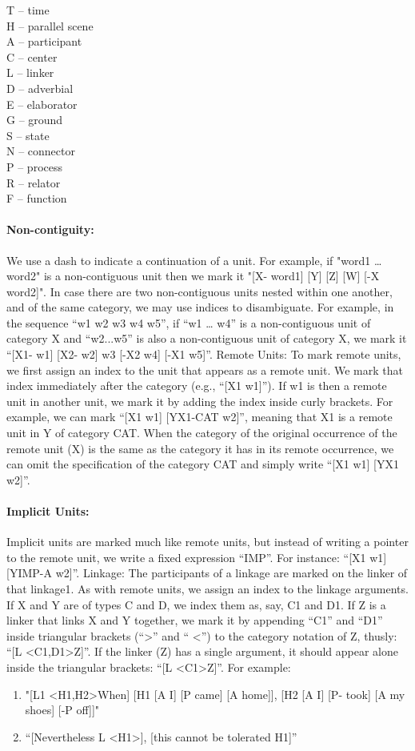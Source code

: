 \documentclass[11pt]{article}
\newcommand{\be}{\begin{enumerate}}
\newcommand{\ee}{\end{enumerate}}
\begin{document}
\noindent
T -- time \\
H -- parallel scene \\
A -- participant \\
C -- center \\
L -- linker\\
D -- adverbial\\
E -- elaborator\\
G -- ground\\
S -- state\\
N -- connector\\
P -- process\\
R -- relator\\
F -- function\\


\paragraph{Non-contiguity:} We use a dash to indicate a continuation of a unit. For example, if "word1 … word2" is a non-contiguous unit then we mark it "[X- word1] [Y] [Z] [W] [-X word2]".
In case there are two non-contiguous units nested within one another, and of the same category, we may use indices to disambiguate. For example, in the sequence ``w1 w2 w3 w4 w5'', if ``w1 … w4'' is a non-contiguous unit of category X and ``w2...w5'' is also a non-contiguous unit of category X, we mark it ``[X1- w1] [X2- w2] w3 [-X2 w4] [-X1 w5]''.
Remote Units: To mark remote units, we first assign an index to the unit that appears as a remote unit. We mark that index immediately after the category (e.g., ``[X1 w1]''). If w1 is then a remote unit in another unit, we mark it by adding the index inside curly brackets. For example, we can mark ``[X1 w1] [Y{X1-CAT} w2]'', meaning that X1 is a remote unit in Y of category CAT. When the category of the original occurrence of the remote unit (X) is the same as the category it has in its remote occurrence, we can omit the specification of the category CAT and simply write ``[X1 w1] [Y{X1} w2]''.

\paragraph{Implicit Units:}
Implicit units are marked much like remote units, but instead of writing a pointer to the remote unit, we write a fixed expression ``IMP''. For instance: ``[X1 w1] [Y{IMP-A} w2]''.
Linkage: The participants of a linkage are marked on the linker of that linkage1. As with remote units, we assign an index to the linkage arguments. If X and Y are of types C and D, we index them as, say, C1 and D1. If Z is a linker that links X and Y together, we mark it by appending ``C1'' and ``D1'' inside triangular brackets (``\textgreater'' and `` \textless '') to the category notation of Z, thusly: ``[L \textless C1,D1\textgreater Z]''. If the linker (Z) has a single argument, it should appear alone inside the triangular brackets: ``[L \textless C1\textgreater Z]''. For example:

\be
\item
"[L1 \textless H1,H2\textgreater When] [H1 [A I] [P came] [A home]], [H2 [A I] [P- took] [A my shoes] [-P off]]"
\item
``[Nevertheless L \textless H1\textgreater], [this cannot be tolerated H1]''
\ee
\end{document}
